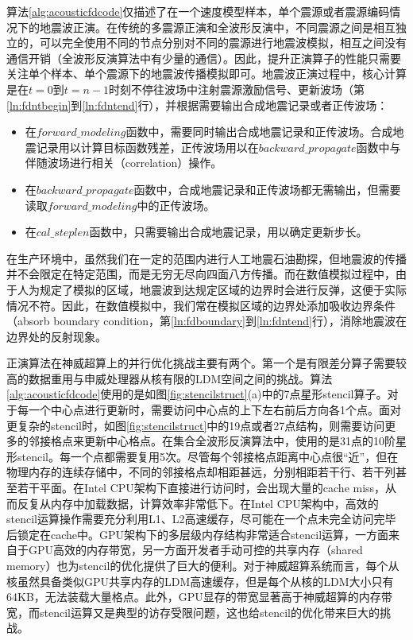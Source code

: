 算法\ref{alg:acousticfdcode}仅描述了在一个速度模型样本，单个震源或者震源编码情况下的地震波正演。在传统的多震源正演和全波形反演中，不同震源之间是相互独立的，可以完全使用不同的节点分别对不同的震源进行地震波模拟，相互之间没有通信开销（全波形反演算法中有少量的通信）。因此，提升正演算子的性能只需要关注单个样本、单个震源下的地震波传播模拟即可。地震波正演过程中，核心计算是在$t=0$到$t=n-1$时刻不停往波场中注射震源激励信号、更新波场（第\ref{ln:fdntbegin}到\ref{ln:fdntend}行），并根据需要输出合成地震记录或者正传波场：
\begin{itemize}
  \item 在$forward\_modeling$函数中，需要同时输出合成地震记录和正传波场。合成地震记录用以计算目标函数残差，正传波场用以在$backward\_propagate$函数中与伴随波场进行相关（correlation）操作。
  \item 在$backward\_propagate$函数中，合成地震记录和正传波场都无需输出，但需要读取$forward\_modeling$中的正传波场。
  \item 在$cal\_steplen$函数中，只需要输出合成地震记录，用以确定更新步长。
\end{itemize}

在生产环境中，虽然我们在一定的范围内进行人工地震石油勘探，但地震波的传播并不会限定在特定范围，而是无穷无尽向四面八方传播。而在数值模拟过程中，由于人为规定了模拟的区域，地震波到达规定区域的边界时会进行反弹，这便于实际情况不符。因此，在数值模拟中，我们常在模拟区域的边界处添加吸收边界条件（absorb boundary condition，第\ref{ln:fdboundary}到\ref{ln:fdntend}行），消除地震波在边界处的反射现象。



正演算法在神威超算上的并行优化挑战主要有两个。第一个是有限差分算子需要较高的数据重用与申威处理器从核有限的LDM空间之间的挑战。算法\ref{alg:acousticfdcode}使用的是如图\ref{fig:stencilstruct}(a)中的7点星形stencil算子。对于每一个中心点进行更新时，需要访问中心点的上下左右前后方向各1个点。面对更复杂的stencil时，如图\ref{fig:stencilstruct}中的19点或者27点结构，则需要访问更多的邻接格点来更新中心格点。在集合全波形反演算法中，使用的是31点的10阶星形stencil。每一个点都需要复用5次。尽管每个邻接格点距离中心点很“近”，但在物理内存的连续存储中，不同的邻接格点却相距甚远，分别相距若干行、若干列甚至若干平面。在Intel CPU架构下直接进行访问时，会出现大量的cache miss，从而反复从内存中加载数据，计算效率非常低下。在Intel CPU架构中，高效的stencil运算操作需要充分利用L1、L2高速缓存，尽可能在一个点未完全访问完毕后锁定在cache中\cite{datta2008stencil,datta2009optimization,sellappa2004cache}。GPU架构下的多层级内存结构非常适合stencil运算，一方面来自于GPU高效的内存带宽，另一方面开发者手动可控的共享内存（shared memory）也为stencil的优化提供了巨大的便利\cite{meng2009performance,nguyen20103,micikevicius20093d}。对于神威超算系统而言，每个从核虽然具备类似GPU共享内存的LDM高速缓存，但是每个从核的LDM大小只有64KB，无法装载大量格点。此外，GPU显存的带宽显著高于神威超算的内存带宽，而stencil运算又是典型的访存受限问题，这也给stencil的优化带来巨大的挑战。

